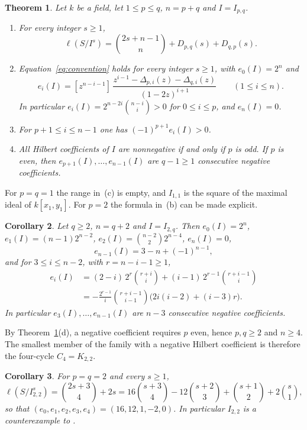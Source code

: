 \documentclass{amsart}
\newtheorem{theorem}{Theorem}[section]
\newtheorem{corollary}[theorem]{Corollary}
\theoremstyle{definition}
\theoremstyle{remark}
\numberwithin{equation}{section}
\newcommand{\cf}[1]{[#1]\,}
\begin{document}
\begin{theorem}\label{thm:main}
Let $k$ be a field, let $1\le p\le q$, $n=p+q$ and $I=I_{p,q}$.
\begin{enumerate}[label=\textup{(\alph*)}]
\item For every integer $s\ge1$,
\[
  \ell(S/I^s)=\binom{2s+n-1}{n}+D_{p,q}(s)+D_{q,p}(s).
\]
\item Equation~\eqref{eq:convention} holds for every integer $s\ge1$, with
$e_0(I)=2^n$ and
\[
  e_i(I)=\cf{z^{n-i-1}}\frac{z^{i-1}-\Delta_{p,i}(z)-\Delta_{q,i}(z)}{(1-2z)^{i+1}}
  \qquad (1\le i\le n).
\]
In particular $e_i(I)=2^{n-2i}\binom{n-i}{i}>0$ for $0\le i\le p$, and
$e_n(I)=0$.
\item For $p+1\le i\le n-1$ one has $(-1)^{p+1}e_i(I)>0$.
\item All Hilbert coefficients of $I$ are nonnegative if and only if $p$ is odd.
If $p$ is even, then $e_{p+1}(I),\dots,e_{n-1}(I)$ are $q-1\ge1$ consecutive
negative coefficients.
\end{enumerate}
\end{theorem}

For $p=q=1$ the range in~(c) is empty, and $I_{1,1}$ is the square of the
maximal ideal of $k[x_1,y_1]$. For $p=2$ the formula in~(b) can be made
explicit.

\begin{corollary}\label{cor:k2q}
Let $q\ge2$, $n=q+2$ and $I=I_{2,q}$. Then $e_0(I)=2^n$,
$e_1(I)=(n-1)2^{n-2}$, $e_2(I)=\binom{n-2}{2}2^{n-4}$, $e_n(I)=0$,
\[
  e_{n-1}(I)=3-n+(-1)^{n-1},
\]
and for $3\le i\le n-2$, with $r=n-i-1\ge1$,
\begin{align*}
  e_i(I)&=(2-i)\,2^r\binom{r+i}{i}+(i-1)\,2^{r-1}\binom{r+i-1}{i}\\
  &=-\frac{2^{r-1}}{i}\binom{r+i-1}{i-1}\bigl(2i(i-2)+(i-3)r\bigr).
\end{align*}
In particular $e_3(I),\dots,e_{n-1}(I)$ are $n-3$ consecutive negative
coefficients.
\end{corollary}

By Theorem~\ref{thm:main}(d), a negative coefficient requires $p$ even, hence
$p,q\ge2$ and $n\ge4$. The smallest member of the family with a negative
Hilbert coefficient is therefore the four-cycle $C_4=K_{2,2}$.

\begin{corollary}\label{cor:c4}
For $p=q=2$ and every $s\ge1$,
\[
  \ell(S/I_{2,2}^s)=\binom{2s+3}{4}+2s
  =16\binom{s+3}{4}-12\binom{s+2}{3}+\binom{s+1}{2}+2\binom{s}{1},
\]
so that $(e_0,e_1,e_2,e_3,e_4)=(16,12,1,-2,0)$. In particular $I_{2,2}$ is a
counterexample to \cite[Conjecture~1.1]{Fr}.
\end{corollary}
\end{document}
